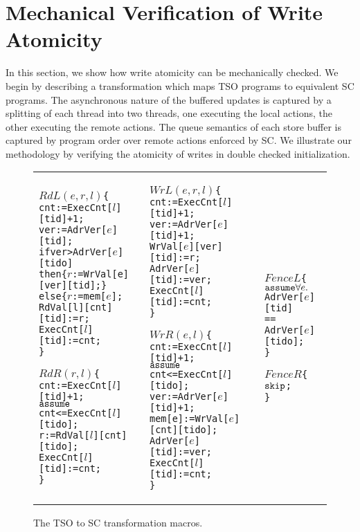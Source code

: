 \section{Mechanical Verification of Write Atomicity}
\label{sec:mechanical-verification}
In this section, we show how write atomicity can be mechanically checked.
We begin by describing a transformation which maps TSO programs to equivalent SC programs.
The asynchronous nature of the buffered updates is captured by a splitting of each thread into two threads, one executing the local actions, the other executing the remote actions.
The queue semantics of each store buffer is captured by program order over remote actions enforced by SC.
We illustrate our methodology by verifying the atomicity of writes in double checked initialization. 


\begin{figure*}
\begin{tabular}{p{}p{}p{}}
\begin{alltt}\(RdL(e,r,l)\) \{  
 cnt:=ExecCnt[\(l\)][tid]+1;
 ver:=AdrVer[\(e\)][tid];
 if ver>AdrVer[\(e\)][tido]
 then \{\(r\):=WrVal[e][ver][tid]; \}
 else \{\(r\):=mem[\(e\)];
 RdVal[l][cnt][tid]:=r;
 ExecCnt[\(l\)][tid]:=cnt;
\}

\(RdR(r,l)\) \{
 cnt:=ExecCnt[\(l\)][tid]+1;
 \(\aliassume\) cnt<=ExecCnt[\(l\)][tido];
 r := RdVal[\(l\)][cnt][tido];
 ExecCnt[\(l\)][tid]:=cnt;
\}
\end{alltt} &

\begin{alltt}\(WrL(e,r,l)\) \{
 cnt:=ExecCnt[\(l\)][tid]+1;
 ver:=AdrVer[\(e\)][tid]+1;
 WrVal[\(e\)][ver][tid]:=r;
 AdrVer[\(e\)][tid]:=ver;
 ExecCnt[\(l\)][tid]:=cnt;
\}

\(WrR(e,l)\) \{
 cnt:=ExecCnt[\(l\)][tid]+1;
 \(\aliassume\) cnt<=ExecCnt[\(l\)][tido];
 ver:=AdrVer[\(e\)][tid]+1;
 mem[e]:=WrVal[\(e\)][cnt][tido];
 AdrVer[\(e\)][tid]:=ver;
 ExecCnt[\(l\)][tid]:=cnt;
\}\end{alltt} & 

\begin{alltt}
\(FenceL\) \{
 \(\aliassume \forall e.\) 
   AdrVer[\(e\)][tid]
        ==
   AdrVer[\(e\)][tido];
\}

\(FenceR\) \{
 \(\aliskip\);
\}\end{alltt}
\end{tabular}
\caption{The TSO to SC transformation macros.}
\label{fig:transformation-macros}
\end{figure*}

